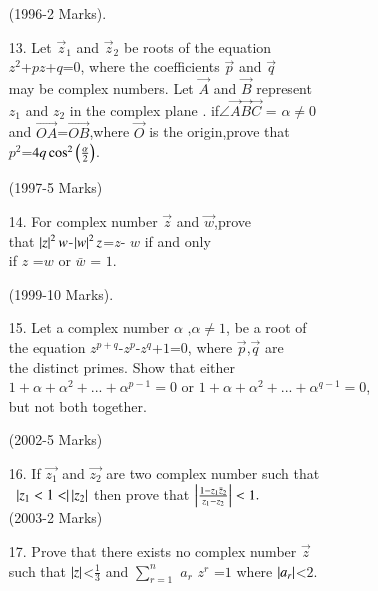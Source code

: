 \documentclass[journal]{IEEEtran}
\theoremstyle{remark}
\begin{document}
\begin{enumerate}
\hfill(1996-2 Marks).\\

\item[13.] Let $\vec{z}_1$ and $\vec{z}_2$ be roots of the equation \\
$z^2$+$pz$+$q$=$0$, where the coefficients $\vec{p}$ and $\vec{q}$\\
may be complex numbers. Let $\Vec{A}$ and $\Vec{B}$ represent \\
$z_1$ and $z_2$ in the complex plane . if$\angle\Vec{A}\Vec{B}\Vec{C}$ = $\alpha \not=0$\\ 
and $\Vec{OA}$=$\Vec{OB}$,where $\vec{O}$ is the origin,prove that \\
$p^2$=$4q\cos^2\left(\frac{\alpha}{2}\right)$. 

\hfill(1997-5 Marks)\\

\item[14.] For complex number $\vec{z}$ and $\vec{w}$,prove \\
that $\left\vert z\right\vert^2w$-$\left\vert w\right\vert^2z$=$z$- $w$  if and only \\
if $z$ =$w$ or $\bar w$ = $1$.
   
\hfill(1999-10 Marks).\\


\item[15.] Let a complex number $\alpha$ ,$\alpha \not=1$, be a root of \\
the equation $z^{p+q}$-$z^p$-$z^q$+$1$=$0$, where $\Vec{p}$,$\Vec{q}$ are \\
the distinct primes. Show that either \\
$1+\alpha+\alpha^2+...+\alpha^{p-1}=0$ or $1+\alpha+\alpha^2+...+\alpha^{q- 1}=0$,\\
but not both together. 

\hfill(2002-5 Marks)\\

\item[16.] If $\vec{z_1}$ and $\vec{z_2}$ are two  complex number such that\\\
     $\left\vert z_1<1<\right\vert\left\vert z_2\right\vert$ then prove that $\left\vert\frac{1-z_1 \bar z_2}{z_1-z_2}\right\vert<1.$\\ 
    
    \hfill(2003-2 Marks)\\

\item[17.] Prove that there exists no  complex number $\vec{z}$ \\
      such that $\left\vert z\right\vert$<$\frac{1}{3}$ and  $\sum_{r=1}^{n}$ $a_r$ $z^r$ =$1$ where $\left\vert a_r\right\vert$<$2$.
    

\end{enumerate}
\end{document}
